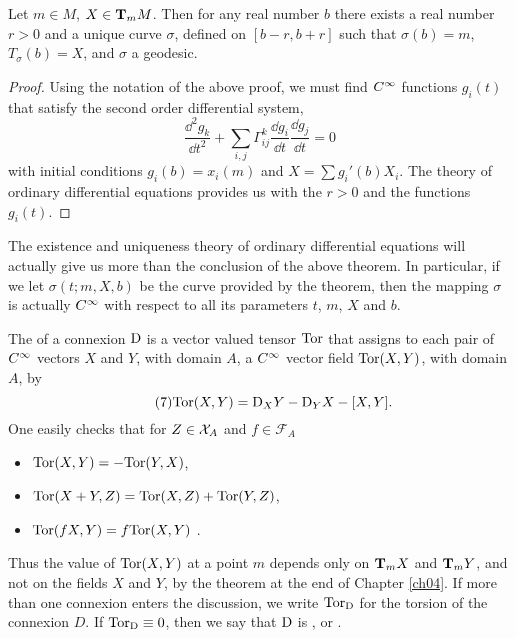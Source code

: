 \documentclass[../main]{subfiles}
\begin{document}
\begin{theorem} \label{thm:ch5.1.2}
Let $m \in M$, $X \in \tangentspace{M}{m}$. Then for any real number $b$ there exists a real number $r > 0$ and a unique curve $\sigma$, defined on $[b-r,b+r]$ such that $\sigma(b) = m$, $T_\sigma(b) = X$, and $\sigma$ a geodesic.
\end{theorem}

\begin{proof}
Using the notation of the above proof, we must find $\CInfty$ functions $g_i(t)$ that satisfy the second order differential system,
\begin{equation}\label{eq:ch05.6}
\tag{6}
\frac{\dd^2 g_k}{\dd t^2} + \sum_{i,j} \Gamma_{ij}^k \frac{\dd g_i}{\dd t} \frac{\dd g_j}{\dd t} = 0
\end{equation}
with initial conditions $g_i(b) = x_i(m)$ and $X = \sum g_i'(b)X_i$. The theory of ordinary differential equations provides us with the $r>0$ and the functions $g_i(t)$.
\end{proof}



The existence and uniqueness theory of ordinary differential equations will actually give us more than the conclusion of the above theorem. In particular, if we let $\sigma(t;m,X,b)$ be the curve provided by the theorem, then the mapping $\sigma$ is actually $\CInfty$ with respect to all its parameters $t$, $m$, $X$ and $b$.

The  of a connexion $\connection$ is a vector valued tensor $\Tor$ that assigns to each pair of $\CInfty$ vectors $X$ and $Y$, with domain $A$, a $\CInfty$ vector field $\Tor(X,Y)$, with domain $A$, by
\begin{equation}\label{eq:ch05.7}\tag{7}
\Tor(X,Y) = \connection_X Y - \connection_Y X - [X,Y].
\end{equation}
One easily checks that for $Z \in \vectorFields_A$ and $f \in \mathcal{F}_A$
\begin{itemize}
    \item $\Tor(X,Y) = -\Tor(Y,X)$,
    \item $ \Tor(X+Y,Z) = \Tor(X,Z) + \Tor(Y,Z)$,
    \item $\Tor(fX,Y) = f\Tor(X,Y)$ . 
\end{itemize}
Thus the value of $\Tor(X,Y)$ at a point $m$ depends only on $\tangentspace{X}{m}$ and $\tangentspace{Y}{m}$, and not on the fields $X$ and $Y$, by the theorem at the end of Chapter \ref{ch04}. If more than one connexion enters the discussion, we write $\Tor_\connection$ for the torsion of the connexion $D$. If $\Tor_\connection \equiv 0$, then we say that $\connection$ is , or .
\end{document}
